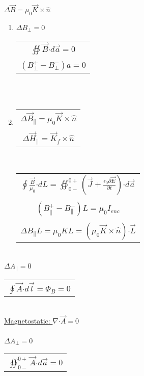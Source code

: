\documentclass[12pt]{article}
\newcommand*{\dotP}{\boldsymbol \cdot}		%
\begin{document}
\begin{minipage}[t]{.55\textwidth}
	\hfill \break
	\( \boxed{ \Delta \vec{B} = \mu_0 \vec{K} \times  \hat{n} } \) \\
	\begin{enumerate}
		\item {
			\( \boxed{ \displaystyle \Delta B_{\perp} = 0 } \) \ \ \ 
			\begin{tabular}{|c}
				\( \displaystyle \oiint \vec{B} \dotP d\vec{a} = 0 \) \\ \\
				\( \displaystyle (B_{\perp}^{+} - B_{\perp}^{-}) a = 0 \) 
			\end{tabular}
		} \\ \\
		\item {
			\begin{tabular}{c}
				\( \boxed{ \displaystyle \Delta \vec{B}_{\parallel} = \mu_0 \vec{K} \times \hat{n}  } \) \\ \\
				\( \boxed{ \displaystyle \Delta \vec{H}_{\parallel} = \vec{K}_f \times \hat{n}  } \)
			\end{tabular}
			\ \ \ 
			\begin{tabular}{|c}
				\( \displaystyle \oint \frac{\vec{B}}{\mu_0} \dotP dL = \oiint_{0-}^{0+} 
					\left ( \vec{J} + \frac{\epsilon_0 \partial \vec{E}}{\partial t} \right ) 
					\dotP d\vec{a} \)\\ \\
				\( \displaystyle (B_{\parallel}^{+} - B_{\parallel}^{-}) L = \mu_0 I_{enc} \) \\ \\
				\( \displaystyle \Delta B_{\parallel}L = \mu_0 K L = (\mu_0 \vec{K} \times \hat{n}) \dotP \vec{L} \)
			\end{tabular}
		}
	\end{enumerate}

	\hfill \break \\
	\( \boxed{ \Delta A_{\parallel} = 0 } \) \ \ \
	\begin{tabular}{|c}
		\( \displaystyle \oint \vec{A} \dotP d\vec{l} = \Phi_B = 0 \)
	\end{tabular}

	\hfill \break \\
	\underline{Magnetostatic: \( \nabla \dotP \vec{A} = 0 \) } \\ \\
	\( \boxed{ \Delta A_{\perp} = 0 } \) \ \ \
	\begin{tabular}{|c}
		\( \displaystyle \oiint_{0-}^{0+} \vec{A} \dotP d\vec{a} = 0 \)
	\end{tabular}	


\end{minipage}
\end{document}
